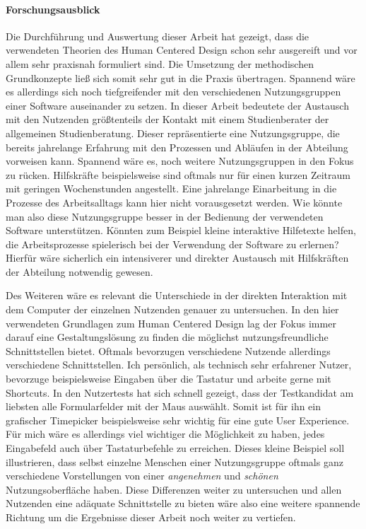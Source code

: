 \paragraph{Forschungsausblick}
Die Durchführung und Auswertung dieser Arbeit hat gezeigt, dass die verwendeten
Theorien des Human Centered Design schon sehr ausgereift und vor allem sehr
praxisnah formuliert sind. Die Umsetzung der methodischen Grundkonzepte ließ
sich somit sehr gut in die Praxis übertragen. Spannend wäre es allerdings sich
noch tiefgreifender mit den verschiedenen Nutzungsgruppen einer Software
auseinander zu setzen. In dieser Arbeit bedeutete der Austausch mit den
Nutzenden größtenteils der Kontakt mit einem Studienberater der allgemeinen
Studienberatung. Dieser repräsentierte eine Nutzungsgruppe, die bereits
jahrelange Erfahrung mit den Prozessen und Abläufen in der Abteilung vorweisen
kann. Spannend wäre es, noch weitere Nutzungsgruppen in den Fokus zu rücken.
Hilfskräfte beispielsweise sind oftmals nur für einen kurzen Zeitraum mit
geringen Wochenstunden angestellt. Eine jahrelange Einarbeitung in die Prozesse
des Arbeitsalltags kann hier nicht vorausgesetzt werden. Wie könnte man also
diese Nutzungsgruppe besser in der Bedienung der verwendeten Software
unterstützen. Könnten zum Beispiel kleine interaktive Hilfetexte helfen, die
Arbeitsprozesse spielerisch bei der Verwendung der Software zu erlernen?
Hierfür wäre sicherlich ein intensiverer und direkter Austausch mit
Hilfskräften der Abteilung notwendig gewesen.

Des Weiteren wäre es relevant die Unterschiede in der direkten Interaktion mit
dem Computer der einzelnen Nutzenden genauer zu untersuchen. In den hier
verwendeten Grundlagen zum Human Centered Design lag der Fokus immer darauf
eine Gestaltungslösung zu finden die möglichst nutzungsfreundliche
Schnittstellen bietet.\cite{hcd} Oftmals bevorzugen verschiedene Nutzende
allerdings verschiedene Schnittstellen. Ich persönlich, als technisch sehr
erfahrener Nutzer, bevorzuge beispielsweise Eingaben über die Tastatur und
arbeite gerne mit Shortcuts. In den Nutzertests hat sich schnell gezeigt, dass
der Testkandidat am liebsten alle Formularfelder mit der Maus auswählt. Somit
ist für ihn ein grafischer Timepicker beispielsweise sehr wichtig für eine gute
User Experience. Für mich wäre es allerdings viel wichtiger die Möglichkeit zu
haben, jedes Eingabefeld auch über Tastaturbefehle zu erreichen. Dieses kleine
Beispiel soll illustrieren, dass selbst einzelne Menschen einer Nutzungsgruppe
oftmals ganz verschiedene Vorstellungen von einer \textit{angenehmen} und
\textit{schönen} Nutzungsoberfläche haben. Diese Differenzen weiter zu
untersuchen und allen Nutzenden eine adäquate Schnittstelle zu bieten wäre also
eine weitere spannende Richtung um die Ergebnisse dieser Arbeit noch weiter zu
vertiefen.